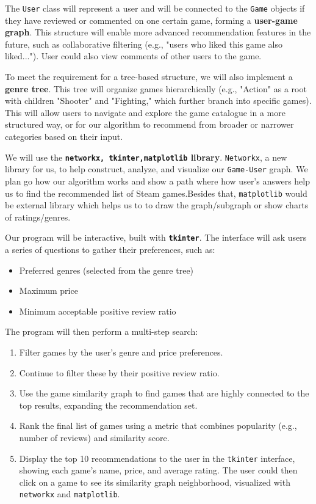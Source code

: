 \documentclass[fontsize=11pt]{article}
\begin{document}
The \texttt{User} class will represent a user and will be connected to the \texttt{Game} objects if they have reviewed or commented on one certain game, forming a \textbf{user-game graph}. This structure will enable more advanced recommendation features in the future, such as collaborative filtering (e.g., "users who liked this game also liked..."). User could also view comments of other users to the game.

To meet the requirement for a tree-based structure, we will also implement a \textbf{genre tree}. This tree will organize games hierarchically (e.g., "Action" as a root with children "Shooter" and "Fighting," which further branch into specific games). This will allow users to navigate and explore the game catalogue in a more structured way, or for our algorithm to recommend from broader or narrower categories based on their input.

We will use the \textbf{\texttt{networkx, tkinter,matplotlib} library}. \texttt{Networkx}, a new library for us, to help construct, analyze, and visualize our \texttt{Game-User} graph. We plan go how our algorithm works and show a path where how user's answers help us to find the recommended list of Steam games.Besides that, \texttt{matplotlib} would be external library which helps us to to draw the graph/subgraph or show charts of ratings/genres.

Our program will be interactive, built with \textbf{\texttt{tkinter}}. The interface will ask users a series of questions to gather their preferences, such as:
\begin{itemize}
    \item Preferred genres (selected from the genre tree)
    \item Maximum price
    \item Minimum acceptable positive review ratio
\end{itemize}

\newpage

The program will then perform a multi-step search:
\begin{enumerate}
    \item Filter games by the user's genre and price preferences.
    \item Continue to filter these by their positive review ratio.
    \item Use the game similarity graph to find games that are highly connected to the top results, expanding the recommendation set.
    \item Rank the final list of games using a metric that combines popularity (e.g., number of reviews) and similarity score.
    \item Display the top 10 recommendations to the user in the \texttt{tkinter} interface, showing each game's name, price, and average rating. The user could then click on a game to see its similarity graph neighborhood, visualized with \texttt{networkx} and \texttt{matplotlib}.
\end{enumerate}
\end{document}
